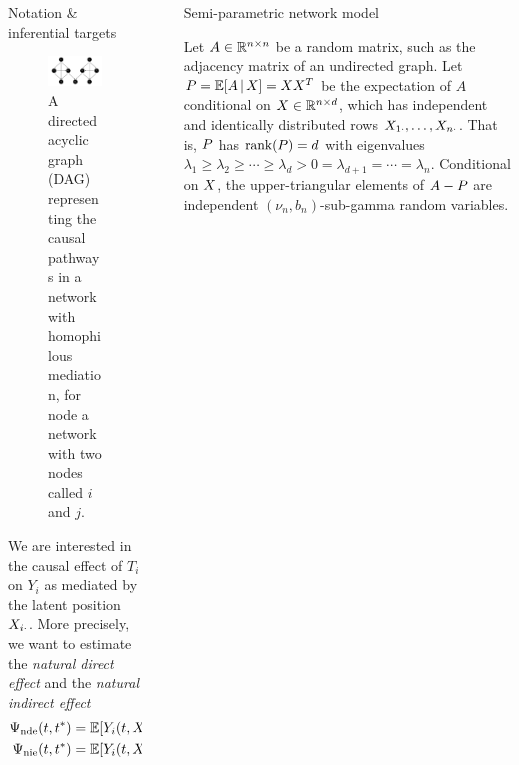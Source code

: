 \documentclass[final]{beamer}
\newlength{\sepwidth}
\newlength{\colwidth}
\newcommand{\separatorcolumn}{\begin{column}{\sepwidth}\end{column}}
\begin{document}
\begin{frame}[t]
\begin{columns}[t]
\begin{column}{\colwidth}
\begin{block}{Notation \& inferential targets}
\begin{minipage}{.5\textwidth}
                    \begin{figure}[ht]
                        \centering
                        \includegraphics[width=\textwidth]{figures/dags/full_mediating.png}
                        \caption{A directed acyclic graph (DAG) representing the causal pathways in a network with homophilous mediation, for node a network with two nodes called $i$ and $j$.}
                        \label{fig:mediating}
                    \end{figure}

                \end{minipage}

                We are interested in the causal effect of $T_i$ on $Y_i$ as mediated by the latent position $X_{i \cdot}$. More precisely, we want to estimate the \emph{natural direct effect} and the \emph{natural indirect effect}
                \begin{align*}
                    \ndef & = \E{Y_i(t, \X_{i \cdot}(t^*)) - Y_i(t^*, \X_{i \cdot}(t^*))} \\
                    \nief & = \E{Y_i(t, \X_{i \cdot}(t)) - Y_i(t, \X_{i \cdot}(t^*))}
                \end{align*}
            \end{block}

        \end{column}

        \separatorcolumn

        \begin{column}{\colwidth}

            \begin{block}{Semi-parametric network model}

                Let $A \in \mathbb{R}^{n \times n}$ be a random matrix, such as the adjacency matrix of an undirected graph. Let $\Apop = \E[\X]{A} = \X \X^T$ be the expectation of $A$ conditional on $X \in \mathbb{R}^{n \times d}$, which has independent and identically distributed rows $X_{1 \cdot}, \dots, X_{n \cdot}$. That is, $P$ has $\rank \paren*{\Apop} = d$ with eigenvalues $\lambda_1 \ge \lambda_2 \ge \cdots \ge \lambda_d > 0 = \lambda_{d+1} = \cdots = \lambda_n$. Conditional on $X$, the upper-triangular elements of $A - P$ are independent $(\nu_n, b_n)$-sub-gamma random variables.


\end{block}
\end{column}
\end{columns}
\end{frame}
\end{document}
